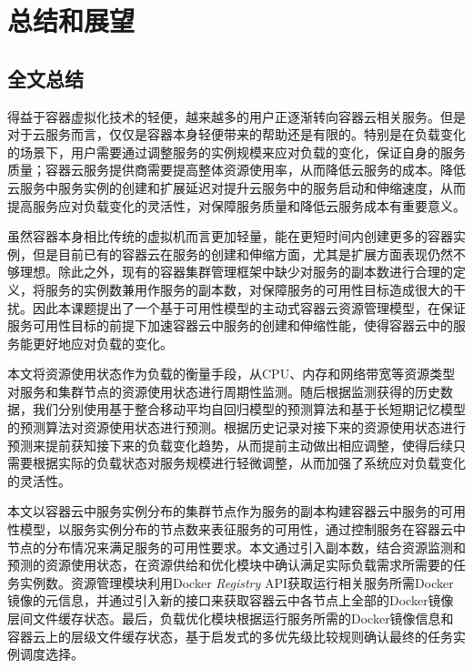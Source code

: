 \chapter{总结和展望}\label{chap:summary}
\section{全文总结}
得益于容器虚拟化技术的轻便，越来越多的用户正逐渐转向容器云相关服务。但是对于云服务而言，仅仅是容器本身轻便带来的帮助还是有限的。特别是在负载变化的场景下，用户需要通过调整服务的实例规模来应对负载的变化，保证自身的服务质量；容器云服务提供商需要提高整体资源使用率，从而降低云服务的成本。降低云服务中服务实例的创建和扩展延迟对提升云服务中的服务启动和伸缩速度，从而提高服务应对负载变化的灵活性，对保障服务质量和降低云服务成本有重要意义。

虽然容器本身相比传统的虚拟机而言更加轻量，能在更短时间内创建更多的容器实例，但是目前已有的容器云在服务的创建和伸缩方面，尤其是扩展方面表现仍然不够理想。除此之外，现有的容器集群管理框架中缺少对服务的副本数进行合理的定义，将服务的实例数兼用作服务的副本数，对保障服务的可用性目标造成很大的干扰。因此本课题提出了一个基于可用性模型的主动式容器云资源管理模型，在保证服务可用性目标的前提下加速容器云中服务的创建和伸缩性能，使得容器云中的服务能更好地应对负载的变化。

本文将资源使用状态作为负载的衡量手段，从CPU、内存和网络带宽等资源类型对服务和集群节点的资源使用状态进行周期性监测。随后根据监测获得的历史数据，我们分别使用基于整合移动平均自回归模型的预测算法和基于长短期记忆模型的预测算法对资源使用状态进行预测。根据历史记录对接下来的资源使用状态进行预测来提前获知接下来的负载变化趋势，从而提前主动做出相应调整，使得后续只需要根据实际的负载状态对服务规模进行轻微调整，从而加强了系统应对负载变化的灵活性。

本文以容器云中服务实例分布的集群节点作为服务的副本构建容器云中服务的可用性模型，以服务实例分布的节点数来表征服务的可用性，通过控制服务在容器云中节点的分布情况来满足服务的可用性要求。本文通过引入副本数，结合资源监测和预测的资源使用状态，在资源供给和优化模块中确认满足实际负载需求所需要的任务实例数。资源管理模块利用Docker \emph{Registry} API获取运行相关服务所需Docker镜像的元信息，并通过引入新的接口来获取容器云中各节点上全部的Docker镜像层间文件缓存状态。最后，负载优化模块根据运行服务所需的Docker镜像信息和容器云上的层级文件缓存状态，基于启发式的多优先级比较规则确认最终的任务实例调度选择。


